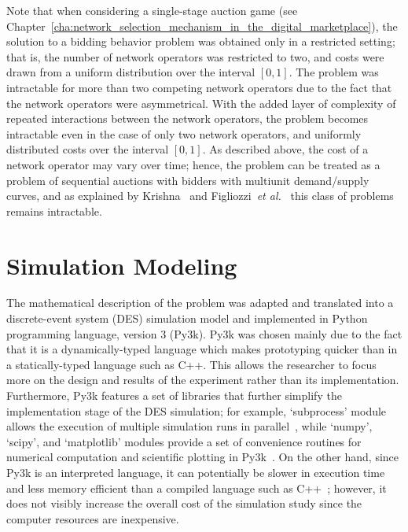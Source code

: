 Note that when considering a single-stage auction game (see Chapter~\ref{cha:network_selection_mechanism_in_the_digital_marketplace}), the solution to a bidding behavior problem was obtained only in a restricted setting; that is, the number of network operators was restricted to two, and costs were drawn from a uniform distribution over the interval $[0,1]$. The problem was intractable for more than two competing network operators due to the fact that the network operators were asymmetrical. With the added layer of complexity of repeated interactions between the network operators, the problem becomes intractable even in the case of only two network operators, and uniformly distributed costs over the interval $[0,1]$. As described above, the cost of a network operator may vary over time; hence, the problem can be treated as a problem of sequential auctions with bidders with multiunit demand/supply curves, and as explained by Krishna~\cite{Krishna10} and Figliozzi~\emph{et al.}~\cite{FigliozziJaillet2008} this class of problems remains intractable.

\section{Simulation Modeling} %
\label{sec:simulation_modeling_dynamic}
The mathematical description of the problem was adapted and translated into a discrete-event system (DES) simulation model and implemented in Python programming language, version 3 (Py3k). Py3k was chosen mainly due to the fact that it is a dynamically-typed language which makes prototyping quicker than in a statically-typed language such as C++. This allows the researcher to focus more on the design and results of the experiment rather than its implementation. Furthermore, Py3k features a set of libraries that further simplify the implementation stage of the DES simulation; for example, `subprocess' module allows the execution of multiple simulation runs in parallel~\cite{Py3kSubprocess}, while `numpy', `scipy', and `matplotlib' modules provide a set of convenience routines for numerical computation and scientific plotting in Py3k~\cite{Numpy, Scipy, Matplotlib}. On the other hand, since Py3k is an interpreted language, it can potentially be slower in execution time and less memory efficient than a compiled language such as C++~\cite{Py3kC++}; however, it does not visibly increase the overall cost of the simulation study since the computer resources are inexpensive.

